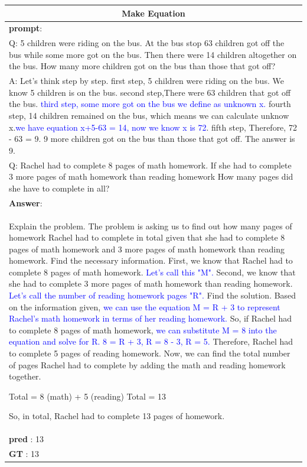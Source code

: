 \documentclass[11pt]{article}
\begin{document}
\begin{table}[htbp]
\begin{tabularx}{\textwidth}{X}
    \toprule
    \multicolumn{1}{c}{\textbf{Make Equation}} \\
    \midrule
\textbf{prompt}: \\
Q: 5 children were riding on the bus. At the bus stop 63 children got off the bus while some more got on the bus. Then there were 14 children altogether on the bus. How many more children got on the bus than those that got off?\\
A: Let's think step by step. first step, 5 children were riding on the bus. We know 5 children is on the bus. second step,There were 63 children that got off the bus. \textcolor{blue}{third step, some more got on the bus we define as unknown x.} fourth step, 14 children remained on the bus, which means we can calculate unknow x.\textcolor{blue}{we have equation x+5-63 = 14, now we know x is 72}. fifth step, Therefore, 72 - 63 = 9. 9 more children got on the bus than those that got off. The answer is 9.\\
Q: Rachel had to complete 8 pages of math homework. If she had to complete 3 more pages of math homework than reading homework How many pages did she have to complete in all?\\
\midrule
\textbf{Answer}:\\
Explain the problem. The problem is asking us to find out how many pages of homework Rachel had to complete in total given that she had to complete 8 pages of math homework and 3 more pages of math homework than reading homework. Find the necessary information. First, we know that Rachel had to complete 8 pages of math homework. \textcolor{blue}{Let's call this "M".} Second, we know that she had to complete 3 more pages of math homework than reading homework.\textcolor{blue}{ Let's call the number of reading homework pages "R".} Find the solution. Based on the information given, \textcolor{blue}{we can use the equation M = R + 3 to represent Rachel's math homework in terms of her reading homework.} So, if Rachel had to complete 8 pages of math homework, \textcolor{blue}{we can substitute M = 8 into the equation and solve for R. 8 = R + 3, R = 8 - 3, R = 5.} Therefore, Rachel had to complete 5 pages of reading homework. Now, we can find the total number of pages Rachel had to complete by adding the math and reading homework together.

Total = 8 (math) + 5 (reading)
Total = 13

So, in total, Rachel had to complete 13 pages of homework.\\
\textbf{pred} : 13\\
\textbf{GT} : 13\\\bottomrule
  \end{tabularx}

%

\end{table}
\end{document}
